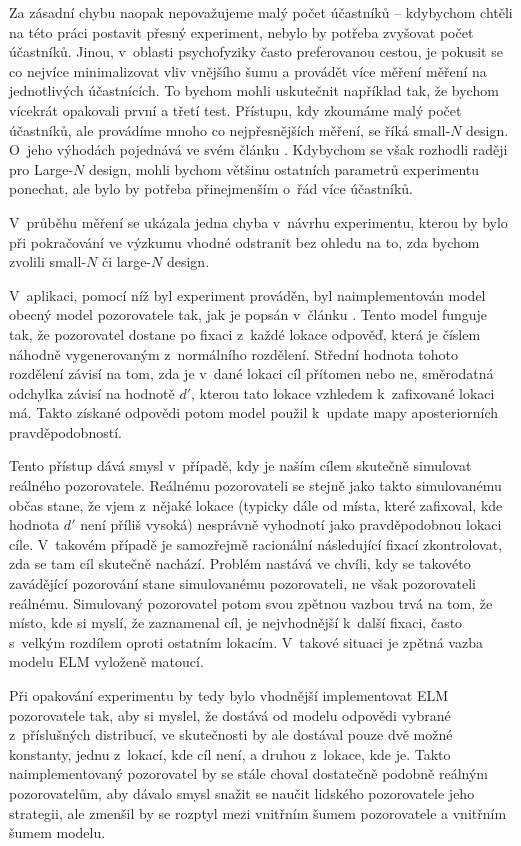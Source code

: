 Za zásadní chybu naopak nepovažujeme malý počet účastníků -- kdybychom chtěli
na této práci postavit přesný experiment, nebylo by potřeba zvyšovat počet
účastníků. Jinou, v~oblasti psychofyziky často preferovanou cestou, je pokusit
se co nejvíce minimalizovat vliv vnějšího šumu a provádět více měření měření na
jednotlivých účastnících. To bychom mohli uskutečnit například tak, že bychom
vícekrát opakovali první a třetí test. Přístupu, kdy zkoumáme malý počet
účastníků, ale provádíme mnoho co nejpřesnějších měření, se říká small-$N$
design. O~jeho výhodách pojednává ve svém článku \citet{SmallN}. Kdybychom se
však rozhodli raději pro Large-$N$ design, mohli bychom většinu ostatních
parametrů experimentu ponechat, ale bylo by potřeba přinejmenším o~řád více
účastníků.

V~průběhu měření se ukázala jedna chyba v~návrhu experimentu, kterou by
bylo při pokračování ve výzkumu vhodné odstranit bez ohledu na to, zda bychom
zvolili small-$N$ či large-$N$ design. 

V~aplikaci, pomocí níž byl experiment prováděn, byl naimplementován model obecný
model pozorovatele tak, jak je popsán v~článku \citep{Najemnik05}. Tento model
funguje tak, že pozorovatel dostane po fixaci z~každé lokace odpověď, která je
číslem náhodně vygenerovaným z~normálního rozdělení. Střední hodnota tohoto
rozdělení závisí na tom, zda je v~dané lokaci cíl přítomen nebo ne, směrodatná
odchylka závisí na hodnotě $d'$, kterou tato lokace vzhledem k~zafixované lokaci
má. Takto získané odpovědi potom model použil k~update mapy aposteriorních
pravděpodobností.

Tento přístup dává smysl v~případě, kdy je naším cílem skutečně simulovat
reálného pozorovatele. Reálnému pozorovateli se stejně jako takto simulovanému
občas stane, že vjem z~nějaké lokace (typicky dále od místa, které zafixoval,
kde hodnota $d'$ není příliš vysoká) nesprávně vyhodnotí jako pravděpodobnou lokaci
cíle. V~takovém případě je samozřejmě racionální následující fixací
zkontrolovat, zda se tam cíl skutečně nachází. Problém nastává ve chvíli, kdy
se takovéto zavádějící pozorování stane simulovanému pozorovateli, ne však
pozorovateli reálnému. Simulovaný pozorovatel potom svou zpětnou vazbou trvá na
tom, že místo, kde si myslí, že zaznamenal cíl, je nejvhodnější k~další fixaci,
často s~velkým rozdílem oproti ostatním lokacím. V~takové situaci je zpětná
vazba modelu ELM vyloženě matoucí. 

Při opakování experimentu by tedy bylo vhodnější implementovat ELM pozorovatele
tak, aby si myslel, že dostává od modelu odpovědi vybrané z~příslušných
distribucí, ve skutečnosti by ale dostával pouze dvě možné konstanty, jednu
z~lokací, kde cíl není, a druhou z~lokace, kde je. Takto naimplementovaný
pozorovatel by se stále choval dostatečně podobně reálným pozorovatelům, aby
dávalo smysl snažit se naučit lidského pozorovatele jeho strategii, ale zmenšil
by se rozptyl mezi vnitřním šumem pozorovatele a vnitřním šumem modelu.

